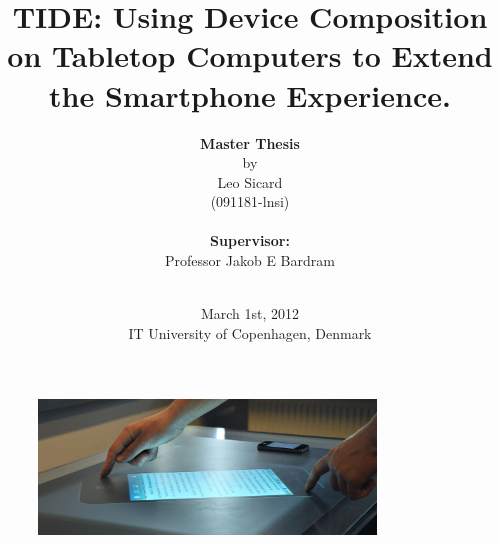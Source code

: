 \documentclass[a4paper,11pt,twoside,onecolumn,openright]{memoir}
\title{\Huge TIDE: Using Device Composition on Tabletop Computers to Extend the Smartphone Experience.}
\author{\textbf{Master Thesis}\\by\\Leo Sicard\\(091181-lnsi)\\
\\
\textbf{Supervisor:}\\Professor Jakob E Bardram\\
\\}
\date{March 1st, 2012\\IT University of Copenhagen, Denmark}
\begin{document}
\maketitle


\begin{figure}[h!]
  \centering
    \includegraphics[width=0.8\textwidth]{images/tide314}
\end{figure}

\pagestyle{empty}



\clearpage

\newpage
\mbox{}
\clearpage

\hfill
\linebreak
\hfill
\linebreak
\hfill
\linebreak
\hfill
\linebreak
\hfill
\linebreak
\hfill
\linebreak
\end{document}
